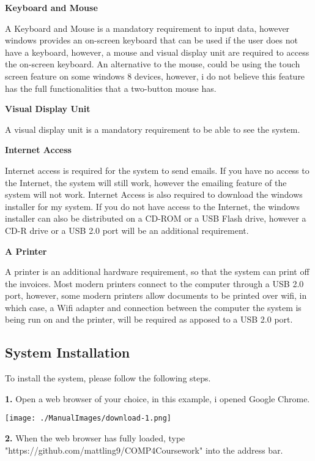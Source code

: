 \textbf{Keyboard and Mouse}

A Keyboard and Mouse is a mandatory requirement to input data, however windows provides an on-screen keyboard that can be used if the user does not have a keyboard, however, a mouse and visual display unit are required to access the on-screen keyboard. An alternative to the mouse, could be using the touch screen feature on some windows 8 devices, however, i do not believe this feature has the full functionalities that a two-button mouse has.

\textbf{Visual Display Unit}

A visual display unit is a mandatory requirement to be able to see the system.

\textbf{Internet Access}

Internet access is required for the system to send emails. If you have no access to the Internet, the system will still work, however the emailing feature of the system will not work. Internet Access is also required to download the windows installer for my system. If you do not have access to the Internet, the windows installer can also be distributed on a CD-ROM or a USB Flash drive, however a CD-R drive or a USB 2.0 port will be an additional requirement.

\pagebreak

\textbf{A Printer}

A printer is an additional hardware requirement, so that the system can print off the invoices. Most modern printers connect to the computer through a USB 2.0 port, however, some modern printers allow documents to be printed over wifi, in which case, a Wifi adapter and connection between the computer the system is being run on and the printer, will be required as apposed to a USB 2.0 port.


\pagebreak
\subsection{System Installation}
\label{fig:System Installation}

To install the system, please follow the following steps.

\textbf{1.} Open a web browser of your choice, in this example, i opened Google Chrome.

\texttt{[image: ./ManualImages/download-1.png]}

\vspace{5mm}

\textbf{2.} When the web browser has fully loaded, type \newline "https://github.com/mattling9/COMP4Coursework" into the address bar.

